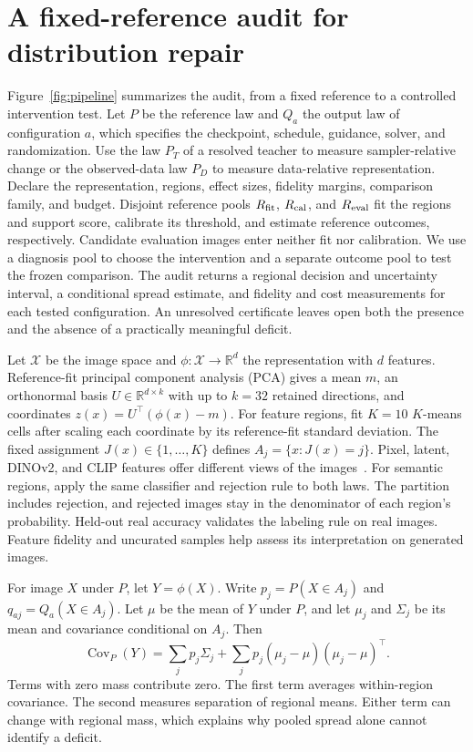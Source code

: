 \section{A fixed-reference audit for distribution repair}
\label{sec:method}
Figure~\ref{fig:pipeline} summarizes the audit, from a fixed reference
to a controlled intervention test.
Let $P$ be the reference law and $Q_a$ the output law of configuration $a$,
which specifies the checkpoint, schedule, guidance, solver, and randomization.
Use the law $P_T$ of a resolved teacher to measure sampler-relative change
or the observed-data law $P_D$ to measure data-relative representation.
Declare the representation, regions, effect sizes, fidelity margins, comparison
family, and budget. Disjoint reference pools $R_{\rm fit}$, $R_{\rm cal}$,
and $R_{\rm eval}$ fit the regions and support score, calibrate its threshold,
and estimate reference outcomes, respectively. Candidate evaluation images
enter neither fit nor calibration. We use a diagnosis pool to choose the
intervention and a separate outcome pool to test the frozen comparison.
The audit returns a regional decision and uncertainty interval, a
conditional spread estimate, and fidelity and cost measurements for each
tested configuration. An unresolved certificate leaves open both the
presence and the absence of a practically meaningful deficit.

Let $\mathcal X$ be the image space and $\phi:\mathcal X\to\mathbb R^d$
the representation with $d$ features. Reference-fit principal component
analysis (PCA) gives a mean $m$, an orthonormal
basis $U\in\mathbb R^{d\times k}$ with up to $k=32$ retained directions,
and coordinates $z(x)=U^\top(\phi(x)-m)$. For feature regions, fit
$K=10$ $K$-means cells after scaling each coordinate by its reference-fit
standard deviation. The fixed assignment $J(x)\in\{1,\ldots,K\}$ defines
$A_j=\{x:J(x)=j\}$. Pixel, latent, DINOv2, and CLIP features offer
different views of the images~\cite{oquab2024dinov2,radford2021clip}.
For semantic regions, apply the same classifier and rejection rule to
both laws. The partition includes rejection, and rejected images stay
in the denominator of each region's probability. Held-out real
accuracy validates the labeling rule on real images. Feature fidelity
and uncurated samples help assess its interpretation on generated images.

For image $X$ under $P$, let $Y=\phi(X)$. Write $p_j=P(X\in A_j)$ and
$q_{aj}=Q_a(X\in A_j)$. Let $\mu$ be the mean of $Y$ under $P$, and let
$\mu_j$ and $\Sigma_j$ be its mean and covariance conditional on $A_j$.
Then
\begin{equation}
\operatorname{Cov}_{P}(Y)
=\sum_j p_j\Sigma_j+\sum_j p_j(\mu_j-\mu)(\mu_j-\mu)^\top.
\label{eq:totalcov}
\end{equation}
Terms with zero mass contribute zero. The first term averages within-region covariance. The second measures
separation of regional means. Either term can change with regional mass,
which explains why pooled spread alone cannot identify a deficit.

